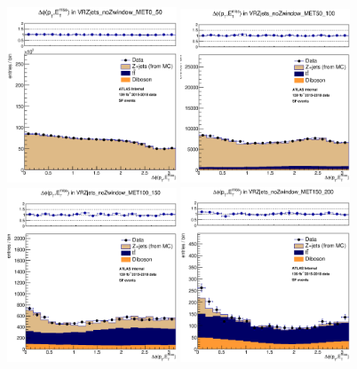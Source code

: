 \begin{figure}[htbp]
\centering
\includegraphics[width=0.45\textwidth]{Images/SUSY/reweight_Ptll_all_SF_dPhiPllMet_VRZ_MET0_50.eps}
\includegraphics[width=0.45\textwidth]{Images/SUSY/reweight_Ptll_all_SF_dPhiPllMet_VRZ_MET50_100.eps}
\includegraphics[width=0.45\textwidth]{Images/SUSY/reweight_Ptll_all_SF_dPhiPllMet_VRZ_MET100_150.eps}
\includegraphics[width=0.45\textwidth]{Images/SUSY/reweight_Ptll_all_SF_dPhiPllMet_VRZ_MET150_200.eps}

\end{figure}
